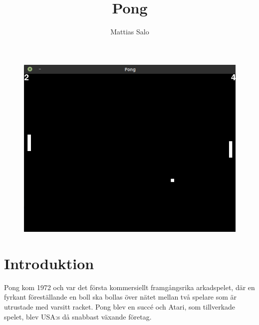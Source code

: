 \documentclass{article}
\author{Mattias Salo}
\title{Pong}
\begin{document}
\maketitle
\begin{figure}[h!]
	\includegraphics[width=\linewidth]{screenshot.png}
\end{figure}
\newpage

\tableofcontents

\newpage

\section{Introduktion}
Pong kom 1972 och var det första kommersiellt framgångsrika arkadspelet, där en fyrkant föreställande en boll ska bollas över nätet mellan två spelare som är utrustade med varsitt racket. Pong blev en succé och Atari, som tillverkade spelet, blev USA:s då snabbast växande företag.
\end{document}
